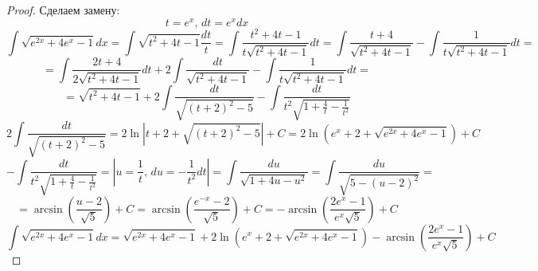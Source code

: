 \documentclass[12pt]{article}
\theoremstyle{definition}
\DeclareMathOperator{\dint}{\displaystyle\int}
\begin{document}
\begin{proof}
	Сделаем замену:
	$$
		t = e^x, \, dt = e^x dx
	$$
	$$
		\dint \sqrt{e^{2x} + 4e^x - 1}dx = \dint \sqrt{t^2 + 4t - 1}\dfrac{dt}{t} =\dint \dfrac{t^2 + 4t -1}{t \sqrt{t^2 + 4t -1}}dt = \dint \dfrac{t + 4}{\sqrt{t^2 + 4t -1}} - \dint \dfrac{1}{t\sqrt{t^2 + 4t -1}}dt =
	$$
	$$
		= \dint \dfrac{2t + 4}{2\sqrt{t^2 + 4t - 1}}dt + 2\dint \dfrac{dt}{\sqrt{t^2 + 4t - 1}} - \dint \dfrac{1}{t\sqrt{t^2 + 4t -1}}dt =
	$$
	$$
		=\sqrt{t^2 + 4t - 1} +2\dint\dfrac{dt}{\sqrt{(t+2)^2 -5}} - \dint \dfrac{dt}{t^2 \sqrt{1 + \tfrac{4}{t} - \tfrac{1}{t^2}}}		 
	$$
	$$
		2\dint\dfrac{dt}{\sqrt{(t+2)^2 -5}} = 2\ln{|t + 2 + \sqrt{(t+2)^2 -5}|} + C = 2 \ln{(e^x + 2 + \sqrt{e^{2x} + 4e^x -1})} + C
	$$
	$$
		-\dint \dfrac{dt}{t^2 \sqrt{1 + \tfrac{4}{t} - \tfrac{1}{t^2}}} =\left|u = \dfrac{1}{t},\, du = -\dfrac{1}{t^2}dt \right| = \dint \dfrac{du}{\sqrt{1 + 4u - u^2}} = \dint \dfrac{du}{\sqrt{5 - (u-2)^2}} = 
	$$
	$$
		= \arcsin{\left(\dfrac{u-2}{\sqrt{5}}\right)} + C = \arcsin{\left(\dfrac{e^{-x} - 2}{\sqrt{5}}\right)} + C = - \arcsin{\left(\dfrac{2e^{x} - 1}{e^x \sqrt{5}}\right)} + C
	$$
	$$
		\dint \sqrt{e^{2x} + 4e^x - 1}dx = \sqrt{e^{2x} + 4e^x - 1} + 2 \ln{(e^x + 2 + \sqrt{e^{2x} + 4e^x -1})} - \arcsin{\left(\dfrac{2e^{x} - 1}{e^x \sqrt{5}}\right)} + C
	$$
\end{proof}
\end{document}

